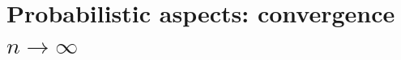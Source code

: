 \documentclass[11pt]{article}
\begin{document}
\section{Probabilistic aspects: convergence \texorpdfstring{$n\to \infty$}{n to infinity}}
\label{sec:probabilistic2}
%
%
%
%
\end{document}
